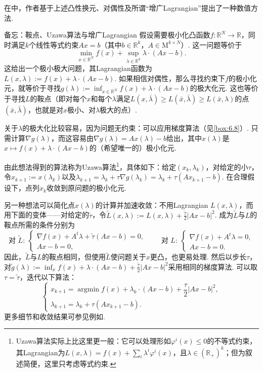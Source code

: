 在\cite{b34}中，作者基于上述凸性换元、对偶性及所谓“增广Lagrangian”提出了一种数值方法.

\begin{sourcebox}{备忘：鞍点、Uzawa算法与增广Lagrangian}\label{box:6.1}
假设需要极小化凸函数$f:\mathbb R^N\to\mathbb R$，同时满足$k$个线性等式约束$Ax=b$（其中$b\in\mathbb R^k$，$A\in\mathrm M^{k\times N}$）. 这一问题等价于
\[
\min_{x\in\mathbb R^N} f(x)+\sup_{\lambda\in\mathbb R^k}\lambda\cdot(Ax-b).
\]
这给出一个极小极大问题，其Lagrangian函数为$L(x,\lambda):=f(x)+\lambda\cdot(Ax-b)$. 如果相信对偶性，那么寻找约束下$f$的极小化元，就等价于寻找$g(\lambda):=\inf_{x\in\mathbb R^N} f(x)+\lambda\cdot(Ax-b)$的极大化元. 这也等价于寻找$L$的鞍点（即对每个$x$和每个$\lambda$满足$L(x,\bar\lambda)\ge L(\bar x,\bar\lambda)\ge L(\bar x,\lambda)$的点$(\bar x,\bar\lambda)$，也就是对$x$极小、对$\lambda$极大的点）.

关于$\lambda$的极大化比较容易，因为问题无约束：可以应用梯度算法（见\autoref{box:6.8}）. 只需计算$\nabla g(\lambda)$，而这容易由$\nabla g(\lambda)=Ax(\lambda)-b$给出，其中$x(\lambda)$是$x\mapsto f(x)+\lambda\cdot(Ax-b)$的（希望唯一的）极小化元.

由此想法得到的算法称为Uzawa算法\footnote{Uzawa算法实际上比这里更一般：它可以处理形如$\varphi^i(x)\le0$的不等式约束，其Lagrangian为$L(x,\lambda)=f(x)+\sum_i\lambda^i\varphi^i(x)$，且$\lambda\in(\mathbb R_+)^k$；但为叙述简便，这里只考虑等式约束.}，具体如下：给定$(x_k,\lambda_k)$，对给定的小$\tau$，令$x_{k+1}:=x(\lambda_k)$以及$\lambda_{k+1}=\lambda_k+\tau\nabla g(\lambda_k)=\lambda_k+\tau(Ax_{k+1}-b)$. 在合理假设下，点列$x_k$收敛到原问题的极小化元.

另一种想法可以简化点$x(\lambda)$的计算并加速收敛：不用Lagrangian $L(x,\lambda)$，而用下面的变体——对给定的$\tilde\tau$，令$\widetilde L(x,\lambda):=L(x,\lambda)+\frac{\tilde\tau}{2}|Ax-b|^2$. 成为$\widetilde L$与$L$的鞍点所需的条件分别为
\[
\text{对 }\widetilde L:\ 
\begin{cases}
\nabla f(x)+A^t\lambda+\tilde\tau(Ax-b)=0,\\
Ax-b=0,
\end{cases}
\qquad
\text{对 }L:\ 
\begin{cases}
\nabla f(x)+A^t\lambda=0,\\
Ax-b=0.
\end{cases}
\]
因此，$\widetilde L$与$L$的鞍点相同，但使用$\widetilde L$使问题关于$x$更凸，也更易处理. 然后以步长$\tau$，对$\tilde g(\lambda):=\inf_x f(x)+\lambda\cdot(Ax-b)+\frac{\tilde\tau}{2}|Ax-b|^2$采用相同的梯度算法. 可以取$\tau=\tilde\tau$，迭代以下算法：
\[
\begin{cases}
x_{k+1}=\operatorname*{argmin} f(x)+\lambda_k\cdot(Ax-b)+\dfrac{\tau}{2}|Ax-b|^2,\\
\lambda_{k+1}=\lambda_k+\tau(Ax_{k+1}-b).
\end{cases}
\]
更多细节和收敛结果可参见例如\cite{b170}.
\end{sourcebox}

